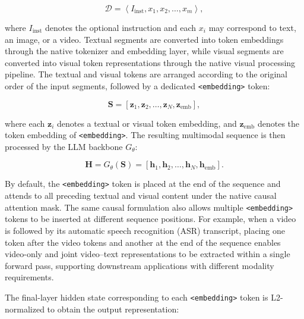 \documentclass[]{wechat}
\begin{document}
\begin{equation}
    \mathcal{D}
    =
    \left\langle
        I_{\mathrm{inst}},
        x_1,
        x_2,
        \ldots,
        x_m
    \right\rangle,
    \label{eq:multimodal_input}
\end{equation}

where $I_{\mathrm{inst}}$ denotes the optional instruction and each $x_i$ may correspond to text, an image, or a video. Textual segments are converted into token embeddings through the native tokenizer and embedding layer, while visual segments are converted into visual token representations through the native visual processing pipeline. The textual and visual tokens are arranged according to the original order of the input segments, followed by a dedicated \texttt{<embedding>} token:

\begin{equation}
    \mathbf{S}
    =
    \left[
        \mathbf{z}_1,
        \mathbf{z}_2,
        \ldots,
        \mathbf{z}_N,
        \mathbf{z}_{\mathrm{emb}}
    \right],
    \label{eq:multimodal_sequence}
\end{equation}

where each $\mathbf{z}_i$ denotes a textual or visual token embedding, and $\mathbf{z}_{\mathrm{emb}}$ denotes the token embedding of \texttt{<embedding>}. The resulting multimodal sequence is then processed by the LLM backbone $G_{\theta}$:

\begin{equation}
    \mathbf{H}
    =
    G_{\theta}(\mathbf{S})
    =
    \left[
        \mathbf{h}_1,
        \mathbf{h}_2,
        \ldots,
        \mathbf{h}_N,
        \mathbf{h}_{\mathrm{emb}}
    \right].
    \label{eq:multimodal_hidden_states}
\end{equation}

By default, the \texttt{<embedding>} token is placed at the end of the sequence and attends to all preceding textual and visual content under the native causal attention mask. The same causal formulation also allows multiple \texttt{<embedding>} tokens to be inserted at different sequence positions. For example, when a video is followed by its automatic speech recognition (ASR) transcript, placing one token after the video tokens and another at the end of the sequence enables video-only and joint video--text representations to be extracted within a single forward pass, supporting downstream applications with different modality requirements.

The final-layer hidden state corresponding to each \texttt{<embedding>} token is L2-normalized to obtain the output representation:
\end{document}

